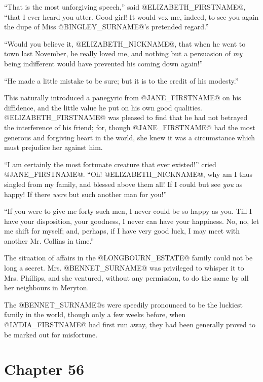 ``That is the most unforgiving speech,'' said @ELIZABETH_FIRSTNAME@, ``that I ever
heard you utter. Good girl! It would vex me, indeed, to see you again
the dupe of Miss @BINGLEY_SURNAME@'s pretended regard.''

``Would you believe it, @ELIZABETH_NICKNAME@, that when he went to town last November,
he really loved me, and nothing but a persuasion of \textit{my} being
indifferent would have prevented his coming down again!''

``He made a little mistake to be sure; but it is to the credit of his
modesty.''

This naturally introduced a panegyric from @JANE_FIRSTNAME@ on his diffidence, and
the little value he put on his own good qualities. @ELIZABETH_FIRSTNAME@ was pleased
to find that he had not betrayed the interference of his friend; for,
though @JANE_FIRSTNAME@ had the most generous and forgiving heart in the world, she
knew it was a circumstance which must prejudice her against him.

``I am certainly the most fortunate creature that ever existed!'' cried
@JANE_FIRSTNAME@. ``Oh! @ELIZABETH_NICKNAME@, why am I thus singled from my family, and blessed
above them all! If I could but see \textit{you} as happy! If there \textit{were} but
such another man for you!''

``If you were to give me forty such men, I never could be so happy as
you. Till I have your disposition, your goodness, I never can have your
happiness. No, no, let me shift for myself; and, perhaps, if I have very
good luck, I may meet with another Mr. Collins in time.''

The situation of affairs in the @LONGBOURN_ESTATE@ family could not be long a
secret. Mrs. @BENNET_SURNAME@ was privileged to whisper it to Mrs. Phillips,
and she ventured, without any permission, to do the same by all her
neighbours in Meryton.

The @BENNET_SURNAME@s were speedily pronounced to be the luckiest family in the
world, though only a few weeks before, when @LYDIA_FIRSTNAME@ had first run away,
they had been generally proved to be marked out for misfortune.



\chapter*{Chapter 56}


